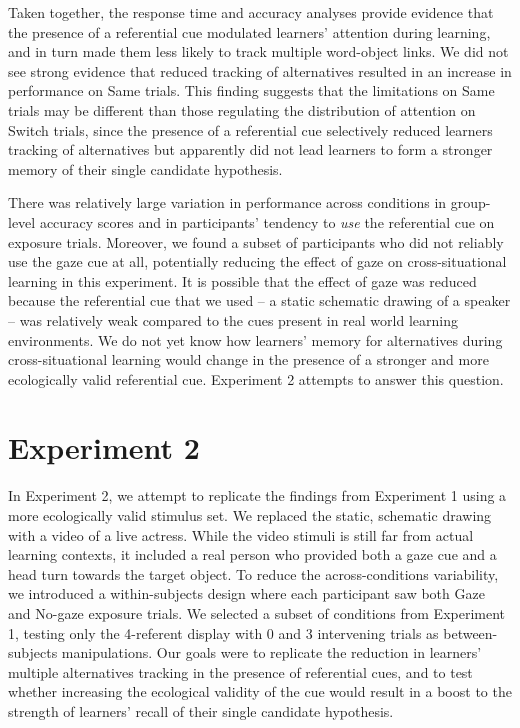 \documentclass[authoryear, review]{elsarticle}
\begin{document}
Taken together, the response time and accuracy analyses provide evidence
that the presence of a referential cue modulated learners' attention
during learning, and in turn made them less likely to track multiple
word-object links. We did not see strong evidence that reduced tracking
of alternatives resulted in an increase in performance on Same trials.
This finding suggests that the limitations on Same trials may be
different than those regulating the distribution of attention on Switch
trials, since the presence of a referential cue selectively reduced
learners tracking of alternatives but apparently did not lead learners
to form a stronger memory of their single candidate hypothesis.

There was relatively large variation in performance across conditions in
group-level accuracy scores and in participants' tendency to \emph{use}
the referential cue on exposure trials. Moreover, we found a subset of
participants who did not reliably use the gaze cue at all, potentially
reducing the effect of gaze on cross-situational learning in this
experiment. It is possible that the effect of gaze was reduced because
the referential cue that we used -- a static schematic drawing of a
speaker -- was relatively weak compared to the cues present in real
world learning environments. We do not yet know how learners' memory for
alternatives during cross-situational learning would change in the
presence of a stronger and more ecologically valid referential cue.
Experiment 2 attempts to answer this question.

\section{Experiment 2}\label{experiment-2}

In Experiment 2, we attempt to replicate the findings from Experiment 1
using a more ecologically valid stimulus set. We replaced the static,
schematic drawing with a video of a live actress. While the video
stimuli is still far from actual learning contexts, it included a real
person who provided both a gaze cue and a head turn towards the target
object. To reduce the across-conditions variability, we introduced a
within-subjects design where each participant saw both Gaze and No-gaze
exposure trials. We selected a subset of conditions from Experiment 1,
testing only the 4-referent display with 0 and 3 intervening trials as
between-subjects manipulations. Our goals were to replicate the
reduction in learners' multiple alternatives tracking in the presence of
referential cues, and to test whether increasing the ecological validity
of the cue would result in a boost to the strength of learners' recall
of their single candidate hypothesis.
\end{document}
